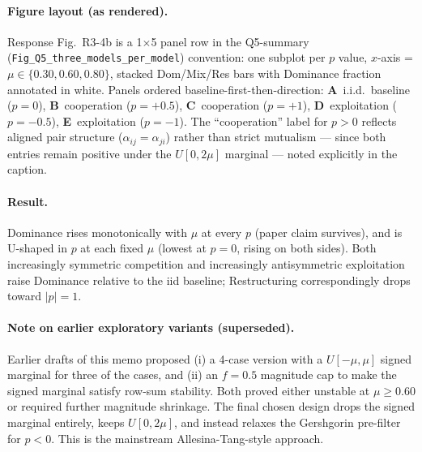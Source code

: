 \documentclass[11pt]{article}
\begin{document}
\paragraph{Figure layout (as rendered).} Response Fig.~R3-4b is a 1$\times$5 panel row in the Q5-summary (\texttt{Fig\_Q5\_three\_models\_per\_model}) convention: one subplot per $p$ value, $x$-axis = $\mu \in \{0.30, 0.60, 0.80\}$, stacked Dom/Mix/Res bars with Dominance fraction annotated in white. Panels ordered baseline-first-then-direction: \textbf{A}~i.i.d.\ baseline ($p=0$), \textbf{B}~cooperation ($p=+0.5$), \textbf{C}~cooperation ($p=+1$), \textbf{D}~exploitation ($p=-0.5$), \textbf{E}~exploitation ($p=-1$). The ``cooperation'' label for $p>0$ reflects aligned pair structure ($\alpha_{ij} = \alpha_{ji}$) rather than strict mutualism --- since both entries remain positive under the $U[0, 2\mu]$ marginal --- noted explicitly in the caption.

\paragraph{Result.} Dominance rises monotonically with $\mu$ at every $p$ (paper claim survives), and is U-shaped in $p$ at each fixed $\mu$ (lowest at $p = 0$, rising on both sides). Both increasingly symmetric competition and increasingly antisymmetric exploitation raise Dominance relative to the iid baseline; Restructuring correspondingly drops toward $|p| = 1$.

\paragraph{Note on earlier exploratory variants (superseded).} Earlier drafts of this memo proposed (i) a 4-case version with a $U[-\mu, \mu]$ signed marginal for three of the cases, and (ii) an $f=0.5$ magnitude cap to make the signed marginal satisfy row-sum stability. Both proved either unstable at $\mu \geq 0.60$ or required further magnitude shrinkage. The final chosen design drops the signed marginal entirely, keeps $U[0, 2\mu]$, and instead relaxes the Gershgorin pre-filter for $p < 0$. This is the mainstream Allesina-Tang-style approach.
\end{document}

